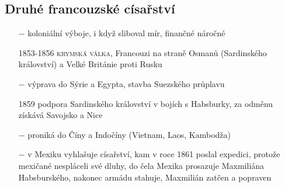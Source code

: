 \documentclass{article}
\begin{document}
\subsection*{Druhé francouzské císařství}
\begin{itemize}
    \vspace{-0.5em}
    \setlength\itemsep{0.15em}
    \item[$-$] koloniální výboje, i když sliboval mír, finančné náročné
    \item[1853-1856] \textsc{krymská válka}, Francouzi na straně Osmanů (Sardinského království) a Velké Británie proti Rusku
    \item[$-$] výprava do Sýrie a Egypta, stavba Suezského průplavu
    \item[1859] podpora Sardinského království v bojích s Habsburky, za odměnu získává Savojsko a Nice
    \item[$-$] proniká do Číny a Indočíny (Vietnam, Laos, Kambodža)
    \item[$-$] v Mexiku vyhlašuje císařství, kam v roce 1861 poslal expedici, protože mexičané nespláceli své dluhy, do čela Mexika prosazuje Maxmiliána Habsburského, nakonec armádu stahuje, Maxmilián zatčen a popraven
\end{itemize}
\end{document}
